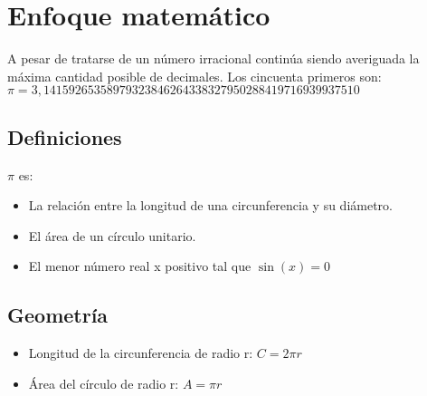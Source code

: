 \documentclass[spanish,11pt,a4paper]{article}
\begin{document}
\section{Enfoque matemático}
A pesar de tratarse de un número irracional continúa siendo averiguada la máxima cantidad posible de decimales. Los cincuenta primeros son:
$\pi = 3,14159265358979323846264338327950288419716939937510$ 

\subsection{Definiciones}
$\pi$ es:

\begin{itemize}
\item La relación entre la longitud de una circunferencia y su diámetro.
\item El área de un círculo unitario.
\item El menor número real x positivo tal que $\sin(x) = 0$
\end{itemize}

\subsection{Geometría}

\begin{itemize}
\item Longitud de la circunferencia de radio r: $ C = 2 \pi r $
\item Área del círculo de radio r: $ A = \pi r $
\end{itemize}



\end{document}
